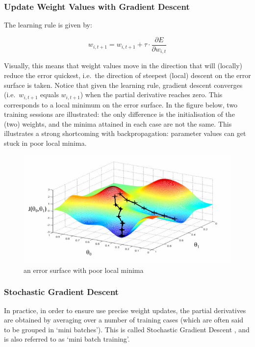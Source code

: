 \documentclass[a4paper,11pt]{article}
\begin{document}
\subsubsection{Update Weight Values with Gradient Descent}

The learning rule is given by:

\begin{equation}
 w_{i,t+1} = w_{i,t+1} + \tau \cdot \frac{\partial{E}}{\partial{w_{i,t}}}
 \label{eqn:learning_rule}
\end{equation}

Visually, this means that weight values move in the direction that will (locally) reduce the error quickest, i.e.\ the direction of steepest (local) descent on the error surface is taken. Notice that given the learning rule, gradient descent converges (i.e.\ $w_{i,t+1}$ equals $w_{i,t+1}$) when the partial derivative reaches zero. This corresponds to a local minimum on the error surface. In the figure below, two training sessions are illustrated: the only difference is the initialisation of the (two) weights, and the minima attained in each case are not the same. This illustrates a strong shortcoming with backpropagation: parameter values can get stuck in poor local minima.

\begin{figure}[h!]
	\centering
	\includegraphics[scale=0.8]{images/local_minima.png}
	\caption{an error surface with poor local minima}
\end{figure}


\subsubsection{Stochastic Gradient Descent}

In practice, in order to ensure use precise weight updates, the partial derivatives are obtained by averaging over a number of training cases (which are often said to be grouped in `mini batches'). This is called Stochastic Gradient Descent \cite{DL-book}, and is also referred to as `mini batch training'.
\end{document}
